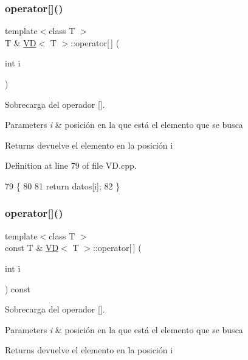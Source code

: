 \subsubsection{\texorpdfstring{operator[]()}{operator[]()}\hspace{0.1cm}{\footnotesize\ttfamily [1/2]}}
{\footnotesize\ttfamily template$<$class T $>$ \\
T \& \hyperlink{classVD}{VD}$<$ T $>$\+::operator\mbox{[}$\,$\mbox{]} (\begin{DoxyParamCaption}\item[{int}]{i }\end{DoxyParamCaption})}



Sobrecarga del operador \mbox{[}\mbox{]}. 


\begin{DoxyParams}{Parameters}
{\em i} & posición en la que está el elemento que se busca \\
\hline
\end{DoxyParams}
\begin{DoxyReturn}{Returns}
devuelve el elemento en la posición i 
\end{DoxyReturn}


Definition at line 79 of file V\+D.\+cpp.


\begin{DoxyCode}
79                           \{
80 
81     \textcolor{keywordflow}{return} datos[i];
82 \}
\end{DoxyCode}
\mbox{\label{classVD_ab0c8adba584dcbb2f07171dedcfc395e}} 
\subsubsection{\texorpdfstring{operator[]()}{operator[]()}\hspace{0.1cm}{\footnotesize\ttfamily [2/2]}}
{\footnotesize\ttfamily template$<$class T $>$ \\
const T \& \hyperlink{classVD}{VD}$<$ T $>$\+::operator\mbox{[}$\,$\mbox{]} (\begin{DoxyParamCaption}\item[{int}]{i }\end{DoxyParamCaption}) const}



Sobrecarga del operador \mbox{[}\mbox{]}. 


\begin{DoxyParams}{Parameters}
{\em i} & posición en la que está el elemento que se busca \\
\hline
\end{DoxyParams}
\begin{DoxyReturn}{Returns}
devuelve el elemento en la posición i 
\end{DoxyReturn}


